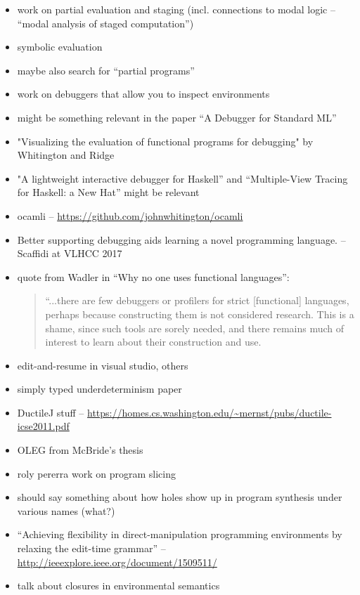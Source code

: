 
\begin{itemize}
	\item work on partial evaluation and staging (incl. connections to modal logic -- ``modal analysis of staged computation'')
	\item symbolic evaluation
	\item maybe also search for ``partial programs'' 
\end{itemize}


\begin{itemize}
	\item work on debuggers that allow you to inspect environments
  \item might be something relevant in the paper ``A Debugger for Standard ML'' 
  \item "Visualizing the evaluation of functional programs for debugging" by Whitington and Ridge
  \item "A lightweight interactive debugger for Haskell'' and ``Multiple-View Tracing for Haskell: a New Hat'' might be relevant
  \item ocamli -- \url{https://github.com/johnwhitington/ocamli}
  \item Better supporting debugging aids learning a novel programming language. -- Scaffidi at VLHCC 2017
  \item quote from Wadler in ``Why no one uses functional languages'':
    \begin{quote}
    “...there are few debuggers or
profilers for strict [functional] languages, perhaps because constructing them is not considered
research. This is a shame, since such tools are sorely needed, and there remains much of
interest to learn about their construction and use.
    \end{quote}
   \item edit-and-resume in visual studio, others
\end{itemize}


\begin{itemize}
	\item simply typed underdeterminism paper
	\item DuctileJ stuff -- \url{https://homes.cs.washington.edu/~mernst/pubs/ductile-icse2011.pdf}
	\item OLEG from McBride's thesis
	\item roly pererra work on program slicing
	\item should say something about how holes show up in program synthesis under various names (what?) 
	\item ``Achieving flexibility in direct-manipulation programming environments by relaxing the edit-time grammar'' -- \url{http://ieeexplore.ieee.org/document/1509511/}
	\item talk about closures in environmental semantics
\end{itemize}
